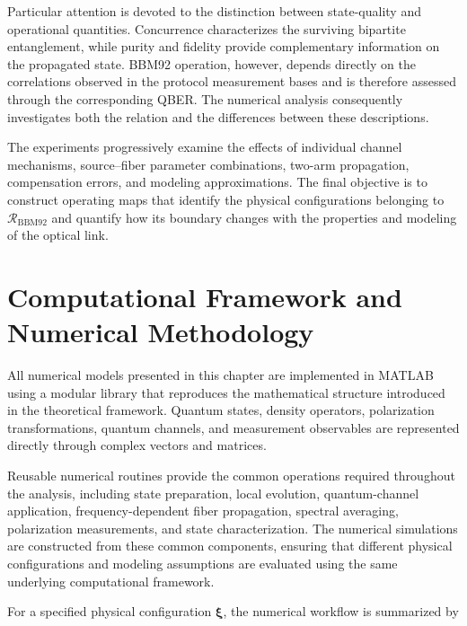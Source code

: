 Particular attention is devoted to the distinction between state-quality and
operational quantities. Concurrence characterizes the surviving bipartite
entanglement, while purity and fidelity provide complementary information on the
propagated state. BBM92 operation, however, depends directly on the correlations
observed in the protocol measurement bases and is therefore assessed through the
corresponding QBER. The numerical analysis consequently investigates both the
relation and the differences between these descriptions.

The experiments progressively examine the effects of individual channel
mechanisms, source--fiber parameter combinations, two-arm propagation,
compensation errors, and modeling approximations. The final objective is to
construct operating maps that identify the physical configurations belonging to
\(\mathcal{R}_{\mathrm{BBM92}}\) and quantify how its boundary changes with the
properties and modeling of the optical link.



\section{Computational Framework and Numerical Methodology}
\label{sec:computational_framework_matlab}

All numerical models presented in this chapter are implemented in MATLAB using a
modular library that reproduces the mathematical structure introduced in the
theoretical framework. Quantum states, density operators, polarization
transformations, quantum channels, and measurement observables are represented
directly through complex vectors and matrices.

Reusable numerical routines provide the common operations required throughout
the analysis, including state preparation, local evolution, quantum-channel
application, frequency-dependent fiber propagation, spectral averaging,
polarization measurements, and state characterization. The numerical simulations
are constructed from these common components, ensuring that different physical
configurations and modeling assumptions are evaluated using the same underlying
computational framework.

For a specified physical configuration \(\boldsymbol{\xi}\), the numerical
workflow is summarized by

